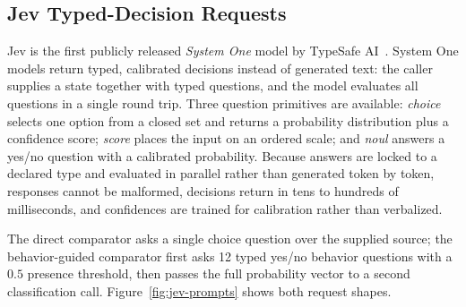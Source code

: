 \subsection{Jev Typed-Decision Requests}

Jev is the first publicly released \emph{System One} model by TypeSafe
AI~\cite{typesafe2026jev}. System One models return typed, calibrated
decisions instead of generated text: the caller supplies a state together
with typed questions, and the model evaluates all questions in a single
round trip. Three question primitives are available: \emph{choice} selects
one option from a closed set and returns a probability distribution plus a
confidence score; \emph{score} places the input on an ordered scale; and
\emph{noul} answers a yes/no question with a calibrated probability. Because
answers are locked to a declared type and evaluated in parallel rather than
generated token by token, responses cannot be malformed, decisions return in
tens to hundreds of milliseconds, and confidences are trained for
calibration rather than verbalized.

The direct comparator asks a single choice question over the supplied source;
the behavior-guided comparator first asks 12 typed yes/no behavior questions
with a $0.5$ presence threshold, then passes the full probability vector to a
second classification call. Figure~\ref{fig:jev-prompts} shows both request
shapes.


